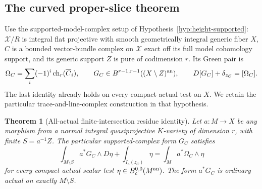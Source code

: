 \documentclass[11pt,a4paper]{article}
\newtheorem{theorem}{Theorem}[section]
\theoremstyle{definition}
\theoremstyle{remark}
\numberwithin{equation}{section}
\begin{document}
\subsection{The curved proper-slice theorem}

Use the supported-model-complex setup of Hypothesis~\ref{hyp:height-supported}:
$\mathcal X/R$ is integral flat projective with smooth geometrically
integral generic fiber $X$, $C$ is a bounded vector-bundle complex on
$\mathcal X$ exact off its full model cohomology support, and its generic
support $Z$ is pure of codimension $r$. Its Green pair is
\[
 \Omega_C=\sum_i(-1)^i\operatorname{ch}_r(\overline C_i),
 \qquad G_C\in B^{r-1,r-1}((X\setminus Z)^{\rm an}),
 \qquad D[G_C]+\delta_{z_C}=[\Omega_C].
\]
The last identity already holds on every compact actual test on $X$.
We retain the particular trace-and-line-complex construction in that hypothesis.

\begin{theorem}[All-actual finite-intersection residue identity]
\label{r16h:curved-slice}
Let $a:M\to X$ be any morphism from a normal integral quasiprojective
$K$-variety of dimension $r$, with finite $S=a^{-1}Z$. The particular
supported-complex form $G_C$ satisfies
\[
 \int_{M\setminus S}a^*G_C\wedge D\eta
       +\int_{I_a(z_C)}\eta
       =\int_M a^*\Omega_C\wedge\eta
 \tag{H16.4}\label{r16h:curved-slice-eq}
\]
for every compact actual scalar test $\eta\in B_c^{0,0}(M^{\rm an})$.
The form $a^*G_C$ is ordinary actual on exactly $M\setminus S$.
\end{theorem}
\end{document}
